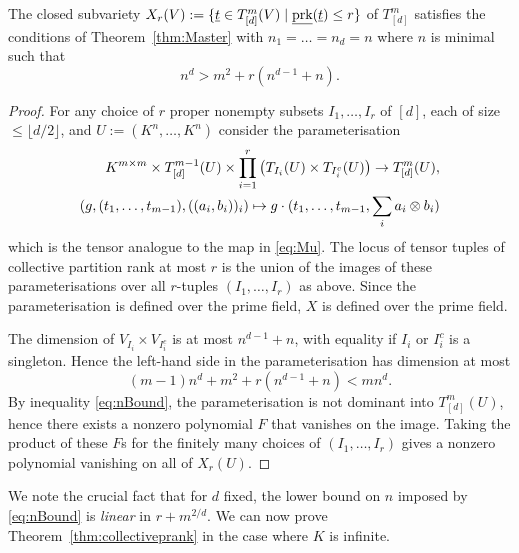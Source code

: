 \documentclass{amsart}
\newcommand{\prk}{\textnormal{prk}}
\newcommand{\ul}[1]{\underline{#1}}
\newcommand{\floor}[1]{\lfloor #1 \rfloor}
\begin{document}
\begin{prop} \label{prop:Bound}
The closed subvariety $X_r(V):=\{\ul{t} \in T_{[d]}^m(V) \mid
\ul{\prk}(\ul{t}) \leq
r\}$ of $T_{[d]}^m$ satisfies the conditions of
Theorem~\ref{thm:Master} with $n_1=\ldots=n_d=n$ where $n$ is
minimal such that 
\begin{equation} \label{eq:nBound}  n^d > m^2 +
r(n^{d-1}+n). \end{equation}
\end{prop}

\begin{proof}
For any choice of $r$ proper nonempty subsets $I_1,\ldots,I_r$ of $[d]$,
each of size $\leq \floor{d/2}$, and $U:=(K^n,\ldots,K^n)$ consider the
parameterisation
\begin{align} 
K^{m \times m} \times T_{[d]}^{m-1}(U) \times \prod_{i=1}^r
\left( T_{I_i}(U) \times T_{I_i^c}(U) \right) \to T_{[d]}^m(U) , \label{eq:Parm}\\
(g,(t_1,\ldots,t_{m-1}),((a_i,b_i))_i) \mapsto 
g \cdot (t_1,\ldots,t_{m-1},\sum_i a_i \otimes b_i) \notag
\end{align}
which is the tensor analogue to the map in \eqref{eq:Mu}. The locus
of tensor tuples of collective partition rank at most $r$ is the union of the images
of these parameterisations over all $r$-tuples $(I_1,\ldots,I_r)$ as
above. Since the parameterisation is defined over the prime field, $X$
is defined over the prime field.

The dimension of $V_{I_i} \times V_{I_i^c}$ is at most $n^{d-1}+n$, with
equality if $I_i$ or $I_i^c$ is a singleton. Hence the left-hand side in the
parameterisation has dimension at most 
\[ (m-1)n^d + m^2 + r(n^{d-1}+n) < mn^d.  
\]
By inequality \eqref{eq:nBound},
the parameterisation is not dominant into $T_{[d]}^m(U)$, hence there
exists a nonzero polynomial $F$ that vanishes on the image. Taking the
product of these $F$s for the finitely many choices of $(I_1,\ldots,I_r)$
gives a nonzero polynomial vanishing on all of $X_r(U)$.
\end{proof}

We note the crucial fact that for $d$ fixed, the lower bound
on $n$ imposed by \eqref{eq:nBound} is {\em linear} in $r+m^{2/d}$. We can now
prove Theorem~\ref{thm:collectiveprank} in the case where $K$ is
infinite. 
\end{document}
